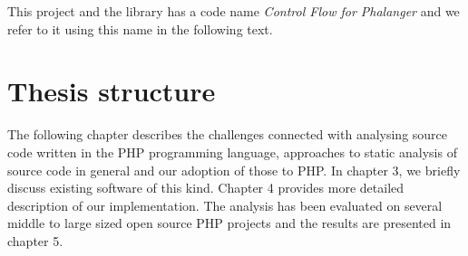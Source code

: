     This project and the library has a code name \emph{Control Flow for Phalanger} 
    and we refer to it using this name in the following text.
    
    \section{Thesis structure}
    
    The following chapter describes the challenges connected with analysing source code 
    written in the PHP programming language, approaches to static analysis of 
    source code in general and our adoption of those to PHP. 
    In chapter 3, we briefly discuss existing software of 
    this kind. Chapter 4 provides more detailed description of our implementation. 
    The analysis has been evaluated on several middle to large sized open source 
    PHP projects and the results are presented in chapter 5.
    